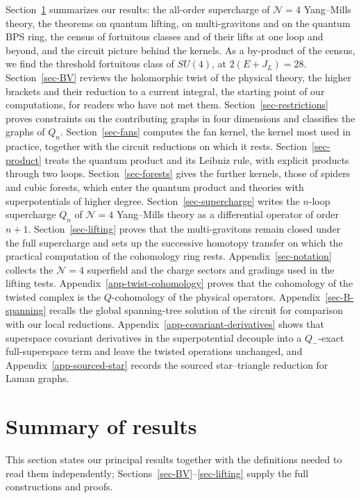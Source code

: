 \documentclass[11pt]{article}
\numberwithin{equation}{section}
\numberwithin{figure}{section}
\numberwithin{table}{section}
\begin{document}
Section~\ref{sec-summary} summarizes our results: the all-order supercharge of $\mathcal N=4$ Yang--Mills theory, the theorems on quantum lifting, on multi-gravitons and on the quantum BPS ring, the census of fortuitous classes and of their lifts at one loop and beyond, and the circuit picture behind the kernels. As a by-product of the census, we find the threshold fortuitous class of $SU(4)$, at $2(E+J_L)=28$. Section~\ref{sec-BV} reviews the holomorphic twist of the physical theory, the higher brackets and their reduction to a current integral, the starting point of our computations, for readers who have not met them. Section~\ref{sec-restrictions} proves constraints on the contributing graphs in four dimensions and classifies the graphs of $Q_n$. Section~\ref{sec-fans} computes the fan kernel, the kernel most used in practice, together with the circuit reductions on which it rests. Section~\ref{sec-product} treats the quantum product and its Leibniz rule, with explicit products through two loops. Section~\ref{sec-forests} gives the further kernels, those of spiders and cubic forests, which enter the quantum product and theories with superpotentials of higher degree. Section~\ref{sec-supercharge} writes the $n$-loop supercharge $Q_n$ of $\mathcal N=4$ Yang--Mills theory as a differential operator of order $n+1$. Section~\ref{sec-lifting} proves that the multi-gravitons remain closed under the full supercharge and sets up the successive homotopy transfer on which the practical computation of the cohomology ring rests. Appendix~\ref{sec-notation} collects the $\mathcal N=4$ superfield and the charge sectors and gradings used in the lifting tests. Appendix~\ref{app-twist-cohomology} proves that the cohomology of the twisted complex is the $Q$-cohomology of the physical operators. Appendix~\ref{sec-B-spanning} recalls the global spanning-tree solution of the circuit for comparison with our local reductions. Appendix~\ref{app-covariant-derivatives} shows that superspace covariant derivatives in the superpotential decouple into a $Q_-$-exact full-superspace term and leave the twisted operations unchanged, and Appendix~\ref{app-sourced-star} records the sourced star--triangle reduction for Laman graphs.

\section{Summary of results}\label{sec-summary}

This section states our principal results together with the definitions needed to read them independently; Sections~\ref{sec-BV}--\ref{sec-lifting} supply the full constructions and proofs.
\end{document}
